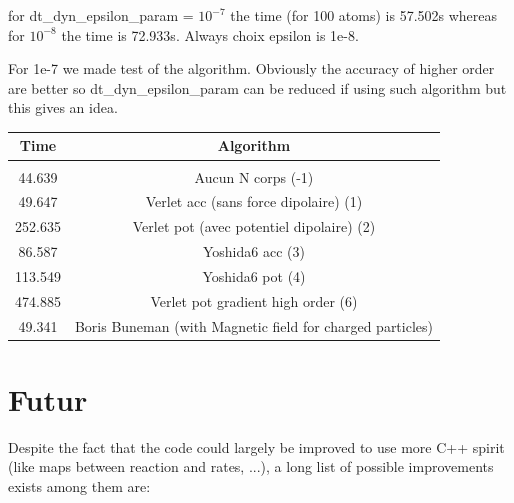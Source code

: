 \documentclass[amsmath,amssymb,nofootinbib]{revtex4-2}
\begin{document}
	 for dt\_dyn\_epsilon\_param = $10^{-7}$ the time (for 100 atoms) is  57.502s whereas for  $10^{-8}$ the time  is  72.933s. Always choix epsilon is 1e-8.
	 
	 For 1e-7 we made test of the algorithm. Obviously the accuracy of higher order are better so dt\_dyn\_epsilon\_param can be reduced if using such algorithm but this gives an idea.
	 
	 	 \begin{tabular}{|c|c|}
	 	\hline
	 	Time & Algorithm \\
	 	\hline
	 	\hline 
	 	\\
	44.639 &	Aucun N corps (-1) \\
	 	\hline
	49.647	& Verlet acc  (sans force dipolaire) (1) \\
	 	\hline
	 252.635	&Verlet pot (avec potentiel dipolaire) (2)  \\
	 	\hline
	 86.587 & Yoshida6 acc (3) \\
	   \hline
	113.549  & Yoshida6 pot (4)  \\
	 	\hline
	474.885 	& Verlet pot gradient high order (6)
	 	\\
	 	\hline
	 49.341	& Boris Buneman  (with Magnetic field for charged particles) \\
	 	\hline
	 \end{tabular}
	 
	 
	 
	 
	 \section{Futur}
	 Despite the fact that the code could largely be improved to use more C++ spirit (like maps between reaction and rates, ...), a long list of possible improvements exists among them are:
	 
\end{document}
